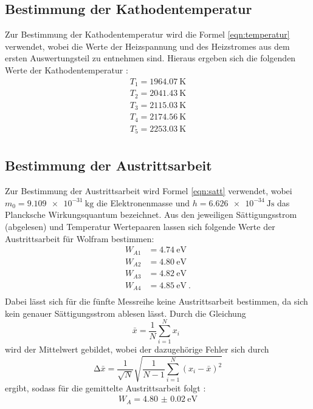 \subsection{Bestimmung der Kathodentemperatur}
Zur Bestimmung der Kathodentemperatur wird die Formel \ref{eqn:temperatur} verwendet, wobei
die Werte der Heizspannung und des Heizstromes aus dem ersten Auswertungsteil zu
entnehmen sind. Hieraus ergeben sich die folgenden Werte der Kathodentemperatur :
\begin{align*}
  T_1= \SI{1964.07}{\kelvin} \\
  T_2= \SI{2041.43}{\kelvin} \\
  T_3= \SI{2115.03}{\kelvin} \\
  T_4= \SI{2174.56}{\kelvin} \\
  T_5= \SI{2253.03}{\kelvin} \\
\end{align*}
\subsection{Bestimmung der Austrittsarbeit}
Zur Bestimmung der Austrittsarbeit wird Formel \ref{eqn:satt} verwendet, wobei
$m_0 = \SI{9.109e-31}{\kilo\gram} $ \cite{q3} die Elektronenmasse und $h= \SI{6.626e-34}{\joule\second}$ \cite{q4}
das Plancksche Wirkungsquantum bezeichnet.
Aus den jeweiligen Sättigungsstrom (abgelesen) und Temperatur Wertepaaren lassen sich
folgende Werte der Austrittsarbeit für Wolfram bestimmen:
\begin{align*}
  W_{A1} &= \SI{4.74}{\electronvolt} \\
  W_{A2} &= \SI{4.80}{\electronvolt} \\
  W_{A3} &= \SI{4.82}{\electronvolt} \\
  W_{A4} &= \SI{4.85}{\electronvolt} \: .\\
\end{align*}
Dabei lässt sich für die fünfte Messreihe keine Austrittsarbeit bestimmen, da sich
kein genauer Sättigungsstrom ablesen lässt.
Durch die Gleichung
\begin{equation}
  \bar{x} = \frac{1}{N} \sum_{i=1}^{N} x_i \: \:
  \label{eqn:mit}
\end{equation}
\noindent wird der Mittelwert gebildet, wobei der dazugehörige Fehler sich durch
\begin{equation}
  \increment \bar{x} = \frac{1}{\sqrt{N}} \sqrt{ \frac{1}{N-1} \sum_{i=1}^N
  (x_i - \bar{x})^2}
  \label{eqn:mitf}
\end{equation}
ergibt, sodass für die gemittelte Austrittsarbeit folgt :
\begin{align*}
  W_A = \SI{4.80(2)}{\electronvolt} \\
\end{align*}
